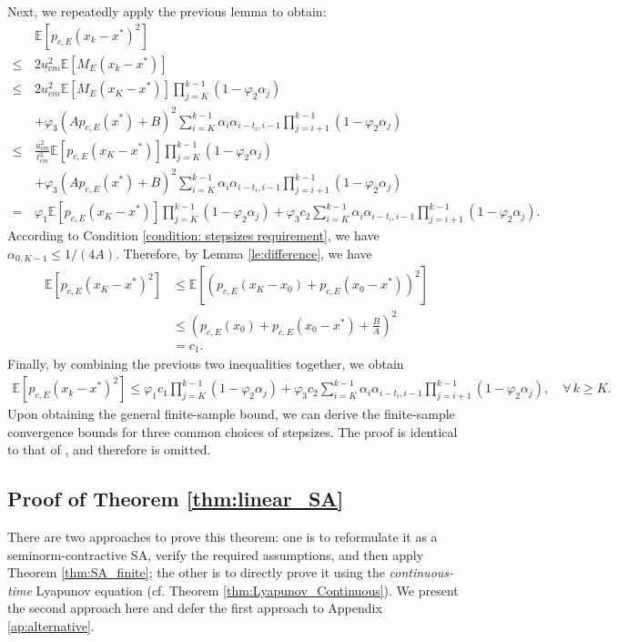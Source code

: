 \documentclass[11 pt]{article}
\begin{document}
	
	Next, we repeatedly apply the previous lemma to obtain:
	\begin{align}
		&\mathbb{E}[p_{c,E}(x_{k}-x^*)^2] \nonumber\\
		\leq\,& 2u_{cm}^2\mathbb{E}[M_E(x_{k}-x^*)]\nonumber\\
		\leq\,& 2u_{cm}^2 \mathbb{E}[M_E(x_{K}-x^*)] \prod^{k-1}_{j=K} (1 - \varphi_2 \alpha_j)\nonumber\\
		& + \varphi_3 (Ap_{c,E}(x^*)+B)^2\sum^{k-1}_{i=K}\alpha_i \alpha_{i-t_i, i-1} \prod^{k-1}_{j=i+1} (1-\varphi_2\alpha_j)\nonumber\\
		\leq \,&\frac{u_{cm}^2}{\ell^2_{cm}} \mathbb{E}[p_{c,E}(x_{K}-x^*)] \prod^{k-1}_{j=K} (1 - \varphi_2 \alpha_j)\nonumber\\
		& + \varphi_3 (Ap_{c,E}(x^*)+B)^2\sum^{k-1}_{i=K}\alpha_i \alpha_{i-t_i, i-1} \prod^{k-1}_{j=i+1} (1-\varphi_2\alpha_j)\nonumber\\
		=\,& \varphi_1 \mathbb{E}[p_{c,E}(x_{K}-x^*)] \prod^{k-1}_{j=K} (1 - \varphi_2 \alpha_j) + \varphi_3c_2 \sum^{k-1}_{i=K}\alpha_i \alpha_{i-t_i, i-1} \prod^{k-1}_{j=i+1} (1-\varphi_2\alpha_j).\label{eq:recursion 4}
	\end{align}
	According to Condition \ref{condition: stepsizes requirement}, we have $\alpha_{0,K-1} \leq 1/(4A)$. Therefore, by Lemma \ref{le:difference}, we have
	\begin{align}\label{eq:almost sure bound}
		\mathbb{E}[p_{c,E}(x_{K}-x^*)^2] &\leq \mathbb{E}\left[\left(p_{c,E}(x_{K}-x_0) + p_{c,E}(x_0 - x^*)\right)^2\right]\nonumber\\
		&\leq \left(p_{c,E}(x_0) + p_{c,E}(x_{0}-x^*) +\frac{B}{A}\right)^2 \nonumber\\
		&= c_1.
	\end{align}
	Finally, by combining the previous two inequalities together, we obtain
	\begin{align*}
		\mathbb{E}[p_{c,E}(x_{k}-x^*)^2] \leq \varphi_1 c_1 \prod^{k-1}_{j=K} (1 - \varphi_2 \alpha_j) + \varphi_3c_2 \sum^{k-1}_{i=K}\alpha_i \alpha_{i-t_i, i-1} \prod^{k-1}_{j=i+1} (1-\varphi_2\alpha_j), \quad \forall\, k \geq K.
	\end{align*}
	Upon obtaining the general finite-sample bound, we can derive the finite-sample convergence bounds for three common choices of stepsizes. The proof is identical to that of \cite[Theorem 2.1]{chen2021lyapunov}, and therefore is omitted.
	
	\subsection{Proof of Theorem \ref{thm:linear_SA}}\label{sec:lsa_pf}
	There are two approaches to prove this theorem: one is to reformulate it as a seminorm-contractive SA, verify the required assumptions, and then apply Theorem \ref{thm:SA_finite}; the other is to directly prove it using the \textit{continuous-time} Lyapunov equation (cf. Theorem \ref{thm:Lyapunov_Continuous}). We present the second approach here and defer the first approach to Appendix \ref{ap:alternative}.
	
\end{document}
